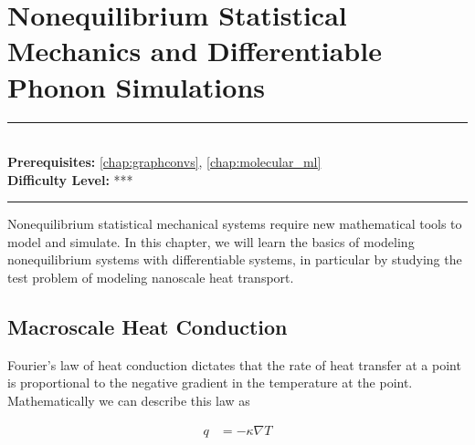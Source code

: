 \documentclass[book.tex]{subfiles}
\begin{document}
\chapter{Nonequilibrium Statistical Mechanics and Differentiable Phonon Simulations}
\label{chap:lattice_graphconvs}
\noindent\rule{11cm}{0.4pt} \\
\textbf{Prerequisites:} \autoref{chap:graphconvs}, \autoref{chap:molecular_ml}   \\
\textbf{Difficulty Level:} *** \\
\noindent\rule{11cm}{0.4pt}
\vspace{5mm}

Nonequilibrium statistical mechanical systems require new mathematical tools to model and simulate. In this chapter, we will learn the basics of modeling nonequilibrium systems with differentiable systems, in particular by studying the test problem of modeling nanoscale heat transport.






\section{Macroscale Heat Conduction}
Fourier's law of heat conduction dictates that the rate of heat transfer at a point is proportional to the negative gradient in the temperature at the point. Mathematically we can describe this law as

\begin{align}
    q &= -\kappa \nabla T
\end{align}
\end{document}
